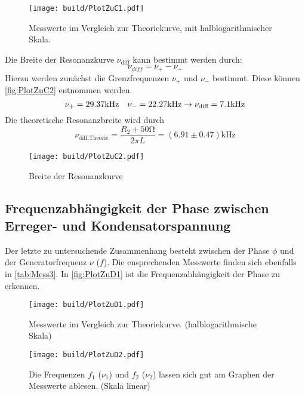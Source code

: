 \begin{figure}
  \centering
  \texttt{[image: build/PlotZuC1.pdf]}
  \caption{Messwerte im Vergleich zur Theoriekurve, mit halblogarithmischer Skala.}
  \label{fig:PlotZuC1}
\end{figure}

Die Breite der Resonanzkurve $\nu_{\text{diff}}$ kann bestimmt werden durch:
\begin{equation}
  \nu_{diff} = \nu_+ - \nu_-
\end{equation}
Hierzu werden zunächst die Grenzfrequenzen $\nu_+$ und $\nu_-$ bestimmt. Diese können \autoref{fig:PlotZuC2} entnommen werden.
\begin{equation}
  \nu_+ = 29.37\unit{\kilo\hertz} \,\,\,\,\,\, \nu_- = 22.27\unit{\kilo\hertz} \\
  \rightarrow \nu_{\text{diff}} = 7.1 \unit{\kilo\hertz}
\end{equation}
Die theoretische Resonanzbreite wird durch
\begin{equation}
  \nu_{\text{diff,Theorie}} = \frac{R_2 +50\unit{\ohm}}{2\pi L} = \left(6.91 \pm 0.47\right)\unit{\kilo\hertz}
\end{equation}

\begin{figure}
  \centering
  \texttt{[image: build/PlotZuC2.pdf]}
  \caption{Breite der Resonanzkurve}
  \label{fig:PlotZuC2}
\end{figure}

\subsection{Frequenzabhängigkeit der Phase zwischen Erreger- und Kondensatorspannung}
\label{subsec:AuswertungD}

Der letzte zu untersuchende Zusammenhang besteht zwischen der Phase $\phi$ und der Generatorfrequenz $\nu$ ($f$). Die ensprechenden Messwerte finden sich
ebenfalls in \autoref{tab:Mess3}. In \autoref{fig:PlotZuD1} ist die Frequenzabhängigkeit der Phase zu erkennen.

\begin{figure}
  \centering
  \texttt{[image: build/PlotZuD1.pdf]}
  \caption{Messwerte im Vergleich zur Theoriekurve. (halblogarithmische Skala)}
  \label{fig:PlotZuD1}
\end{figure}

\begin{figure}
  \centering
  \texttt{[image: build/PlotZuD2.pdf]}
  \caption{Die Frequenzen $f_1$ ($\nu_1$) und $f_2$ ($\nu_2$) lassen sich gut am Graphen der Messwerte ablesen. (Skala linear)}
  \label{fig:PlotZuD2}
\end{figure}

